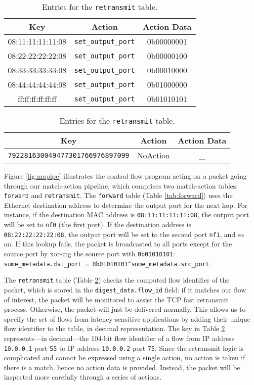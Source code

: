 \begin{table}[!h]
	\centering
	\caption{Entries for the \texttt{forward} table.}
	\label{tab:forward}
	\begin{tabular}{ | c | c | c |}
		\hline
		\textbf{Key} & \textbf{Action} & \textbf{Action Data} \\ \hline
		08:11:11:11:11:08 & \verb|set_output_port| & 0b00000001 \\ \hline
		08:22:22:22:22:08 & \verb|set_output_port| & 0b00000100 \\ \hline
		08:33:33:33:33:08 & \verb|set_output_port| & 0b00010000 \\ \hline
		08:44:44:44:44:08 & \verb|set_output_port| & 0b01000000 \\ \hline
		ff:ff:ff:ff:ff:ff & \verb|set_output_port| & 0b01010101 \\ \hline
	\end{tabular}
\vspace{2em}
	\centering
	\caption{Entries for the \texttt{retransmit} table.}
	\label{tab:retransmit}
	\begin{tabular}{ | c | c | c |}
		\hline
		\textbf{Key} & \textbf{Action} & \textbf{Action Data} \\ \hline
		\texttt{792281630049477301766976897099}  & NoAction & \_ \\ \hline
	\end{tabular}
\end{table}

Figure \ref{fig:mapipe} illustrates the control flow program acting on a packet going through our match-action pipeline, which comprises two match-action tables: \texttt{forward} and \texttt{retransmit}. The \verb|forward| table (Table \ref{tab:forward}) uses the Ethernet destination address to determine the output port for the next hop. For instance, if the destination MAC address is \verb|08:11:11:11:11:08|, the output port will be set to \verb|nf0| (the first port). If the destination address is \verb|08:22:22:22:22:08|, the output port will be set to the second port \verb|nf1|, and so on. If this lookup fails, the packet is broadcasted to all ports except for the source port by xor-ing the source port with \verb|0b01010101|: \verb|sume_metadata.dst_port = 0b01010101^sume_metadata.src_port|. 

The \verb|retransmit| table (Table \ref{tab:retransmit}) checks the computed flow identifier of the packet, which is stored in the \texttt{digest\_data.flow\_id} field: if it matches our flow of interest, the packet will be monitored to assist the TCP fast retransmit process. Otherwise, the packet will just be delivered normally. This allows us to specify the set of flows from latency-sensitive applications by adding their unique flow identifier to the table, in decimal representation. The key in Table \ref{tab:retransmit} represents---in decimal---the 104-bit flow identifier of a flow from IP address \verb|10.0.0.1| port \verb|55| to IP address \verb|10.0.0.2| port \verb|75|. Since the retransmit logic is complicated and cannot be expressed using a single action, no action is taken if there is a match, hence no action data is provided. Instead, the packet will be inspected more carefully through a series of actions.

